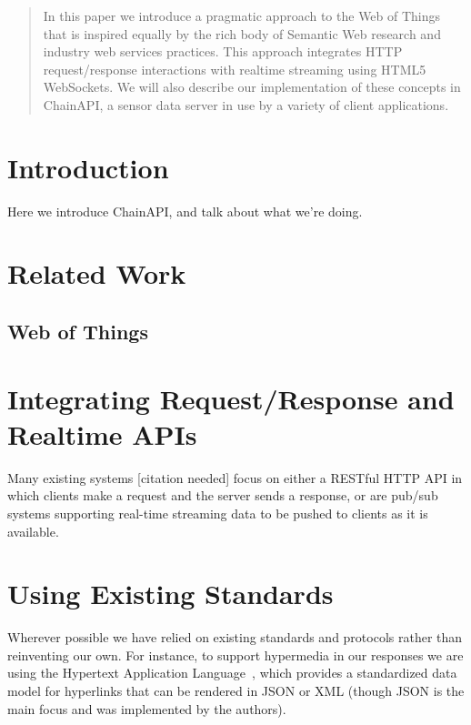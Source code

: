\documentclass{acm_proc_article-sp}
\begin{document}
\begin{abstract}
In this paper we introduce a pragmatic approach to the Web of Things that is
inspired equally by the rich body of Semantic Web research and industry web
services practices. This approach integrates HTTP request/response interactions
with realtime streaming using HTML5 WebSockets. We will also describe our
implementation of these concepts in ChainAPI, a sensor data server in use by
a variety of client applications.
\end{abstract}

%
%

\section{Introduction}
Here we introduce ChainAPI, and talk about what we're doing.

\section{Related Work}

\subsection{Web of Things}

\section{Integrating Request/Response and Realtime APIs}

Many existing systems [citation needed] focus on either a RESTful HTTP API in
which clients make a request and the server sends a response, or are pub/sub
systems supporting real-time streaming data to be pushed to clients as it is
available.

\section{Using Existing Standards}

Wherever possible we have relied on existing standards and protocols rather
than reinventing our own. For instance, to support hypermedia in our responses
we are using the Hypertext Application Language~\cite{json-hal-draft}, which
provides a standardized data model for hyperlinks that can be rendered in JSON
or XML (though JSON is the main focus and was implemented by the authors).
\end{document}
